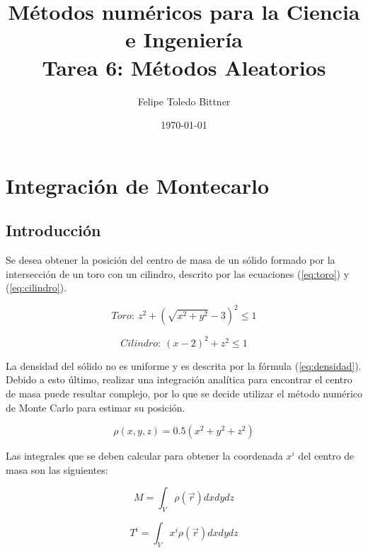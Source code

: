 \documentclass{article}
\title{M\'etodos num\'ericos para la Ciencia e Ingenier\'ia \\ Tarea 6: Métodos Aleatorios} %
\author{Felipe Toledo Bittner} %
\date{\today} %
\begin{document}
\maketitle %


\section{Integración de Montecarlo}

\subsection{Introducción}

Se desea obtener la posición del centro de masa de un sólido formado por la intersección de un toro con un cilindro, descrito por las ecuaciones (\ref{eq:toro}) y (\ref{eq:cilindro}).

\begin{equation}
  Toro:\ z^2 + \left( \sqrt{x^2 + y^2} - 3 \right)^2 \leq 1
  \label{eq:toro}
\end{equation}

\begin{equation}
  Cilindro:\ (x - 2)^2 + z^2 \leq 1
  \label{eq:cilindro}
\end{equation}

La densidad del sólido no es uniforme y es descrita por la fórmula (\ref{eq:densidad}). Debido a esto último, realizar una integración analítica para encontrar el centro de masa puede resultar complejo, por lo que se decide utilizar el método numérico de Monte Carlo para estimar su posición.

\begin{equation}
  \rho(x, y, z) = 0.5 (x^2 + y^2 + z^2)
  \label{eq:densidad}
\end{equation}

Las integrales que se deben calcular para obtener la coordenada $x^i$ del centro de masa son las siguientes:

\begin{equation}
  M = \int_V \rho(\vec{r}) dx dy dz
  \label{eq:calculo_masa}
\end{equation}

\begin{equation}
  T^i = \int_V x^i \rho(\vec{r}) dx dy dz
  \label{eq:calculo_torque}
\end{equation}
\end{document}

